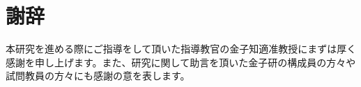 \chapter{謝辞}

本研究を進める際にご指導をして頂いた指導教官の金子知適准教授にまずは厚く感謝を申し上げます。また、研究に関して助言を頂いた金子研の構成員の方々や試問教員の方々にも感謝の意を表します。